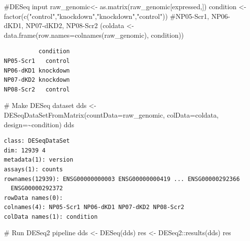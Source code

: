 \documentclass[
  letterpaper,
  DIV=11,
  numbers=noendperiod]{scrartcl}
\newenvironment{Shaded}{\begin{snugshade}}{\end{snugshade}}
\newcommand{\AttributeTok}[1]{\textcolor[rgb]{0.40,0.45,0.13}{#1}}
\newcommand{\CommentTok}[1]{\textcolor[rgb]{0.37,0.37,0.37}{#1}}
\newcommand{\FunctionTok}[1]{\textcolor[rgb]{0.28,0.35,0.67}{#1}}
\newcommand{\NormalTok}[1]{\textcolor[rgb]{0.00,0.23,0.31}{#1}}
\newcommand{\OtherTok}[1]{\textcolor[rgb]{0.00,0.23,0.31}{#1}}
\newcommand{\SpecialCharTok}[1]{\textcolor[rgb]{0.37,0.37,0.37}{#1}}
\newcommand{\StringTok}[1]{\textcolor[rgb]{0.13,0.47,0.30}{#1}}
\begin{document}
\begin{Shaded}
\begin{Highlighting}[]
\CommentTok{\#DESeq input}
\NormalTok{raw\_genomic}\OtherTok{\textless{}{-}} \FunctionTok{as.matrix}\NormalTok{(raw\_genomic[expressed,])}
\NormalTok{condition }\OtherTok{\textless{}{-}} \FunctionTok{factor}\NormalTok{(}\FunctionTok{c}\NormalTok{(}\StringTok{"control"}\NormalTok{,}\StringTok{"knockdown"}\NormalTok{,}\StringTok{"knockdown"}\NormalTok{,}\StringTok{"control"}\NormalTok{)) }\CommentTok{\#NP05{-}Scr1, NP06{-}dKD1, NP07{-}dKD2, NP08{-}Scr2}
\NormalTok{(coldata }\OtherTok{\textless{}{-}} \FunctionTok{data.frame}\NormalTok{(}\AttributeTok{row.names=}\FunctionTok{colnames}\NormalTok{(raw\_genomic), condition))}
\end{Highlighting}
\end{Shaded}

\begin{verbatim}
          condition
NP05-Scr1   control
NP06-dKD1 knockdown
NP07-dKD2 knockdown
NP08-Scr2   control
\end{verbatim}

\begin{Shaded}
\begin{Highlighting}[]
\CommentTok{\# Make DESeq dataset}
\NormalTok{dds }\OtherTok{\textless{}{-}} \FunctionTok{DESeqDataSetFromMatrix}\NormalTok{(}\AttributeTok{countData=}\NormalTok{raw\_genomic, }\AttributeTok{colData=}\NormalTok{coldata, }\AttributeTok{design=}\SpecialCharTok{\textasciitilde{}}\NormalTok{condition)}
\NormalTok{dds}
\end{Highlighting}
\end{Shaded}

\begin{verbatim}
class: DESeqDataSet 
dim: 12939 4 
metadata(1): version
assays(1): counts
rownames(12939): ENSG00000000003 ENSG00000000419 ... ENSG00000292366
  ENSG00000292372
rowData names(0):
colnames(4): NP05-Scr1 NP06-dKD1 NP07-dKD2 NP08-Scr2
colData names(1): condition
\end{verbatim}

\begin{Shaded}
\begin{Highlighting}[]
\CommentTok{\# Run DESeq2 pipeline}
\NormalTok{dds }\OtherTok{\textless{}{-}} \FunctionTok{DESeq}\NormalTok{(dds)}
\NormalTok{res }\OtherTok{\textless{}{-}}\NormalTok{ DESeq2}\SpecialCharTok{::}\FunctionTok{results}\NormalTok{(dds)}
\NormalTok{res}
\end{Highlighting}
\end{Shaded}
\end{document}
